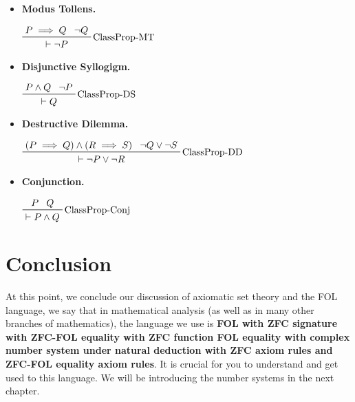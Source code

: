 \documentclass[../main.tex]{subfiles}
\begin{document}
\begin{minipage}[b]{0.6\linewidth}
\begin{itemize}
    \vspace{-.5cm}\item \textbf{Modus Tollens.} \begin{center}$\prftree[r]{ClassProp-MT}{P\implies Q}{\neg Q}{\vdash \neg P}$\end{center}
    \vspace{-.5cm}\item \textbf{Disjunctive Syllogigm.} \begin{center}$\prftree[r]{ClassProp-DS}{P\land Q}{\neg P}{\vdash Q}$\end{center}
    \vspace{-.5cm}\item \textbf{Destructive Dilemma.} \begin{center}$\prftree[r]{ClassProp-DD}{(P\implies Q)\land(R\implies S)}{\neg Q\lor\neg S}{\vdash \neg P\lor\neg R}$\end{center}
    \vspace{-.5cm}\item \textbf{Conjunction.} \begin{center}$\prftree[r]{ClassProp-Conj}{P}{Q}{\vdash P\land Q}$\end{center}
\end{itemize}
\vfill
\end{minipage}

\section{Conclusion}
At this point, we conclude our discussion of axiomatic set theory and the FOL language, we say that in mathematical analysis (as well as in many other branches of mathematics), the language we use is \textbf{FOL with ZFC signature with ZFC-FOL equality with ZFC function FOL equality with complex number system under natural deduction with ZFC axiom rules and ZFC-FOL equality axiom rules}. It is crucial for you to understand and get used to this language. We will be introducing the number systems in the next chapter.
\biblio
\end{document}
